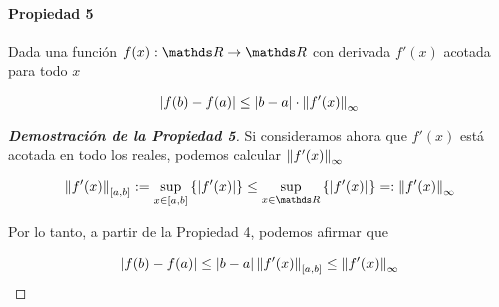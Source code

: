 \paragraph{Propiedad 5} Dada una función $f(x):\reals \to \reals$ con derivada $f'(x)$ acotada para todo $x$

\begin{equation}
    \left|f(b) - f(a)\right| \leq \left|b-a\right|\cdot \left\lVert f'(x)\right\rVert_{\infty}
    \label{eqn:prop5}
\end{equation}

\begin{proof}[\bf{Demostración de la Propiedad 5}]
Si consideramos ahora que $f'(x)$ está acotada en todo los reales, podemos calcular $\left\lVert f'(x)\right\rVert_{\infty}$

\begin{equation}
   \norm{f'(x)}_{[a,b]} := \sup_{x\in[a,b]}   \left\{ \abs{f'(x)} \right\} \leq \sup_{x\in\reals}  \left\{ \abs{f'(x)} \right\} =: \norm{f'(x)}_{\infty}
\end{equation}

Por lo tanto, a partir de la Propiedad 4, podemos afirmar que

\begin{equation}
    \left|f(b) - f(a)\right| \leq \left|b-a\right| \left\lVert f'(x)\right\rVert_{[a,b]} \leq \left\lVert f'(x)\right\rVert_{\infty}
\end{equation}


\end{proof}
